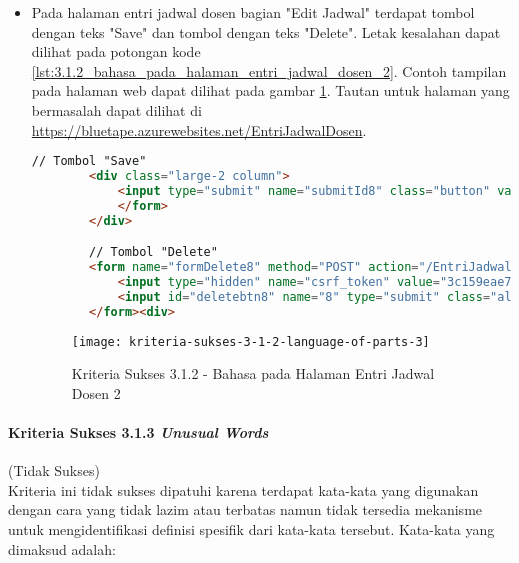 \begin{itemize}
    \item Pada halaman entri jadwal dosen bagian "Edit Jadwal" terdapat tombol dengan teks "Save" dan tombol dengan teks "Delete". Letak kesalahan dapat dilihat pada potongan kode \ref{lst:3.1.2_bahasa_pada_halaman_entri_jadwal_dosen_2}. Contoh tampilan pada halaman web dapat dilihat pada gambar \ref{fig:3.1.2_language_of_parts_3}. Tautan untuk halaman yang bermasalah dapat dilihat di \url{https://bluetape.azurewebsites.net/EntriJadwalDosen}.
    \begin{lstlisting}[frame=single, label={lst:3.1.2_bahasa_pada_halaman_entri_jadwal_dosen_2}, language=HTML, caption=Kriteria Sukses 3.1.2 - Bahasa yang Tidak Sesuai pada Halaman Entri Jadwal Dosen 2]
        // Tombol "Save"
        <div class="large-2 column">
            <input type="submit" name="submitId8" class="button" value="Save">
            </form>
        </div>

        // Tombol "Delete"
        <form name="formDelete8" method="POST" action="/EntriJadwalDosen/delete/8">    
            <input type="hidden" name="csrf_token" value="3c159eae7bc953dd591b679c080ed066"/>
            <input id="deletebtn8" name="8" type="submit" class="alert button" value="Delete">
        </form><div>
    \end{lstlisting}
    
    \begin{figure}[H]
        \centering  
        \texttt{[image: kriteria-sukses-3-1-2-language-of-parts-3]}  
        \caption[Kriteria Sukses 3.1.2 - Bahasa pada Halaman Entri Jadwal Dosen 2]{Kriteria Sukses 3.1.2 - Bahasa pada Halaman Entri Jadwal Dosen 2}
        \label{fig:3.1.2_language_of_parts_3}  
    \end{figure}
\end{itemize}

\paragraph{Kriteria Sukses 3.1.3 \textit{Unusual Words}}
\label{par:kepatuhan_bluetape_kriteria_sukses_3.1.3}
(Tidak Sukses)\\

Kriteria ini tidak sukses dipatuhi karena terdapat kata-kata yang digunakan dengan cara yang tidak lazim atau terbatas namun tidak tersedia mekanisme untuk mengidentifikasi definisi spesifik dari kata-kata tersebut. Kata-kata yang dimaksud adalah:

